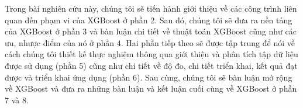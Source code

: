 \documentclass{article}
\begin{document}
Trong bài nghiên cứu này, chúng tôi sẽ tiến hành giới thiệu về các công trình liên quan đến phạm vi của XGBoost ở phần 2. Sau đó, chúng tôi sẽ đưa ra nền tảng của XGBoost ở phần 3 và bàn luận chi tiết về thuật toán XGBoost cũng như các ưu, nhược điểm của nó ở phần 4. Hai phần tiếp theo sẽ được tập trung để nói về cách chúng tôi thiết kế thực nghiệm thông qua giới thiệu và phân tích tập dữ liệu được sử dụng (phần 5) cũng như chi tiết về độ đo, chi tiết triển khai, kết quả đạt được và triển khai ứng dụng (phần 6). Sau cùng, chúng tôi sẽ bàn luận mở rộng về XGBoost và đưa ra những bàn luận và kết luận cuối cùng về XGBoost ở phần 7 và 8.




 

 
\end{document}
